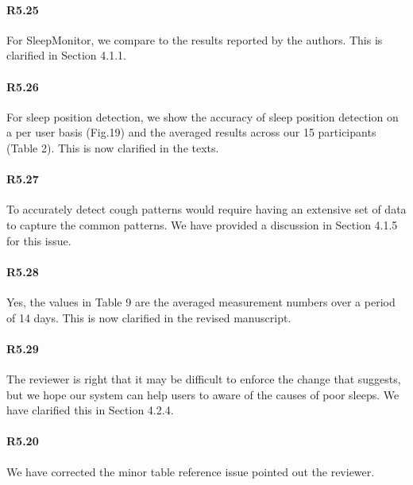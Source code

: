 \paragraph{R5.25} For SleepMonitor, we compare to the results reported by the authors. This is clarified in Section 4.1.1.

\paragraph{R5.26} For sleep position detection, we show the accuracy of sleep position detection on a per user basis (Fig.19) and the
averaged results across our 15 participants (Table 2). This is now clarified in the texts.


\paragraph{R5.27} To accurately detect cough patterns would require having an extensive set of data to capture the common patterns. We have provided a discussion in Section 4.1.5 for this issue.

\paragraph{R5.28} Yes, the values in Table 9 are the averaged measurement numbers over a period of 14 days. This is now clarified in the revised manuscript.

\paragraph{R5.29} The reviewer is right that it may be difficult to enforce the change that \systemname suggests, but we hope our system can help users to aware of the causes of poor sleeps. We have clarified this in Section 4.2.4.

\paragraph{R5.20} We have corrected the minor table reference issue pointed out the reviewer.
